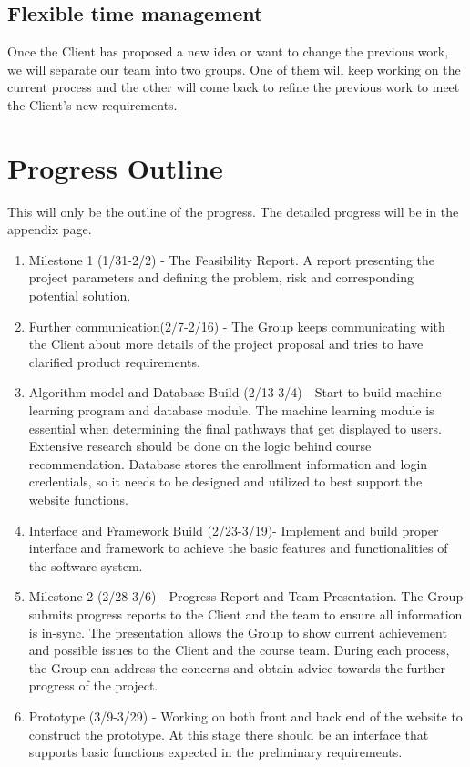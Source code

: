 \documentclass{article}
\begin{document}
\subsection{Flexible time management}
Once the Client has proposed a new idea or want to change the previous work, we will separate our team into two groups. One of them will keep working on the current process and the other will come back to refine the previous work to meet the Client’s new requirements. 

\section{Progress Outline}
This will only be the outline of the progress. The detailed progress will be in the appendix page.

\begin{enumerate}[I]
    \item Milestone 1 (1/31-2/2) - The Feasibility Report. A report presenting the project parameters and defining the problem, risk and corresponding potential solution.
    \item Further communication(2/7-2/16) -  The Group keeps communicating with the Client about more details of the project proposal and tries to have clarified product requirements.
    \item Algorithm model and Database Build (2/13-3/4) - Start to build machine learning program and database module. The machine learning module is essential when determining the final pathways that get displayed to users. Extensive research should be done on the logic behind course recommendation. Database stores the enrollment information and login credentials, so it needs to be designed and utilized to best support the website functions. 
    \item Interface and Framework Build (2/23-3/19)- Implement and build proper interface and framework to achieve the basic features and functionalities of the software system.
    \item Milestone 2 (2/28-3/6)  - Progress Report and Team Presentation. The Group submits progress reports to the Client and the team to ensure all information is in-sync. The presentation allows the Group to show current achievement and possible issues to the Client and the course team. During each process, the Group can address the concerns and obtain advice towards the further progress of the project.
    \item Prototype (3/9-3/29) - Working on both front and back end of the website to construct the prototype. At this stage there should be an interface that supports basic functions expected in the preliminary requirements.

\end{enumerate}
\end{document}

